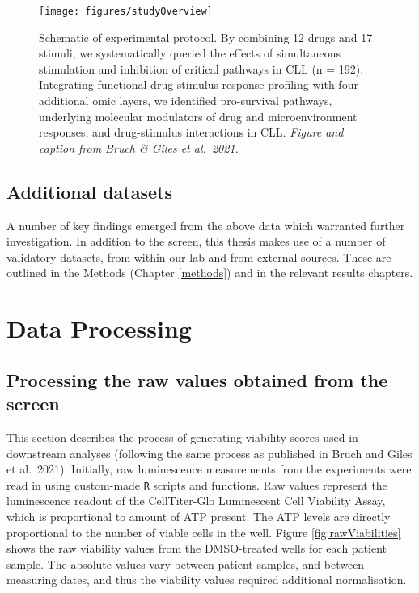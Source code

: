 \documentclass[11pt, a4paper, twosided]{book}
\begin{document}
\begin{figure}

{\centering \texttt{[image: figures/studyOverview]} 

}

\caption{Schematic of experimental protocol. By combining 12 drugs and 17 stimuli, we systematically queried the effects of simultaneous stimulation and inhibition of critical pathways in CLL (n = 192). Integrating functional drug-stimulus response profiling with four additional omic layers, we identified pro-survival pathways, underlying molecular modulators of drug and microenvironment responses, and drug-stimulus interactions in CLL. \emph{Figure and caption from Bruch \& Giles et al.~2021.}}\label{fig:studyOverview}
\end{figure}
\hypertarget{additional-datasets}{%
\subsection{Additional datasets}\label{additional-datasets}}

A number of key findings emerged from the above data which warranted further investigation. In addition to the screen, this thesis makes use of a number of validatory datasets, from within our lab and from external sources. These are outlined in the Methods (Chapter \ref{methods}) and in the relevant results chapters.

\hypertarget{data-processing-1}{%
\section{Data Processing}\label{data-processing-1}}

\hypertarget{processing-the-raw-values-obtained-from-the-screen}{%
\subsection{Processing the raw values obtained from the screen}\label{processing-the-raw-values-obtained-from-the-screen}}

This section describes the process of generating viability scores used in downstream analyses (following the same process as published in Bruch and Giles et al.~2021). Initially, raw luminescence measurements from the experiments were read in using custom-made \texttt{R} scripts and functions. Raw values represent the luminescence readout of the CellTiter-Glo Luminescent Cell Viability Assay, which is proportional to amount of ATP present. The ATP levels are directly proportional to the number of viable cells in the well.
Figure \ref{fig:rawViabilities} shows the raw viability values from the DMSO-treated wells for each patient sample. The absolute values vary between patient samples, and between measuring dates, and thus the viability values required additional normalisation.
\end{document}
